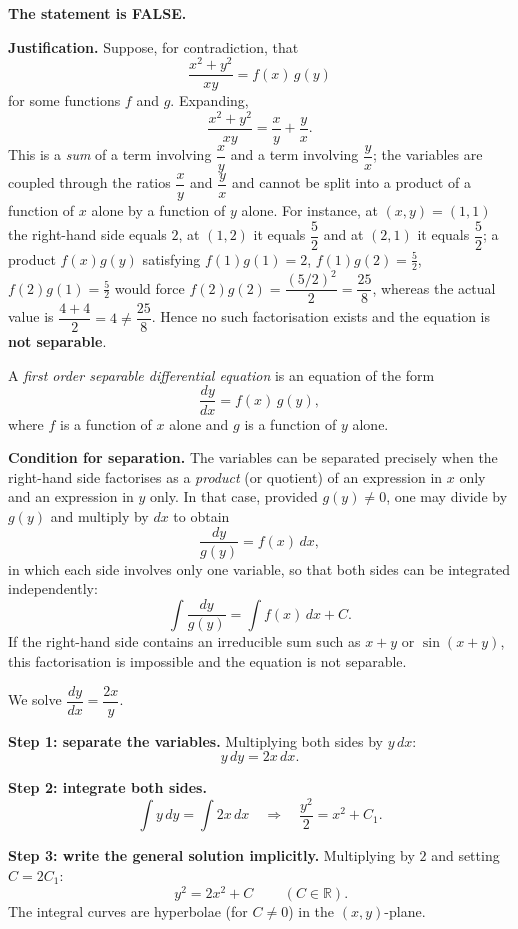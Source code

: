\documentclass[11pt]{article}
\begin{document}
\begin{corrige}
\textbf{The statement is FALSE.}

\textbf{Justification.} Suppose, for contradiction, that
\[
\frac{x^{2}+y^{2}}{xy}=f(x)\,g(y)
\]
for some functions $f$ and $g$. Expanding,
\[
\frac{x^{2}+y^{2}}{xy}=\frac{x}{y}+\frac{y}{x}.
\]
This is a \emph{sum} of a term involving $\dfrac{x}{y}$ and a term involving $\dfrac{y}{x}$; the variables are coupled through the ratios $\dfrac{x}{y}$ and $\dfrac{y}{x}$ and cannot be split into a product of a function of $x$ alone by a function of $y$ alone. For instance, at $(x,y)=(1,1)$ the right-hand side equals $2$, at $(1,2)$ it equals $\dfrac{5}{2}$ and at $(2,1)$ it equals $\dfrac{5}{2}$; a product $f(x)g(y)$ satisfying $f(1)g(1)=2$, $f(1)g(2)=\tfrac52$, $f(2)g(1)=\tfrac52$ would force $f(2)g(2)=\dfrac{(5/2)^2}{2}=\dfrac{25}{8}$, whereas the actual value is $\dfrac{4+4}{2}=4\neq\dfrac{25}{8}$. Hence no such factorisation exists and the equation is \textbf{not separable}.
\end{corrige}

\begin{corrige}
\begin{definition}
A \emph{first order separable differential equation} is an equation of the form
\[
\frac{dy}{dx}=f(x)\,g(y),
\]
where $f$ is a function of $x$ alone and $g$ is a function of $y$ alone.
\end{definition}

\textbf{Condition for separation.} The variables can be separated precisely when the right-hand side factorises as a \emph{product} (or quotient) of an expression in $x$ only and an expression in $y$ only. In that case, provided $g(y)\neq 0$, one may divide by $g(y)$ and multiply by $dx$ to obtain
\[
\frac{dy}{g(y)}=f(x)\,dx,
\]
in which each side involves only one variable, so that both sides can be integrated independently:
\[
\int \frac{dy}{g(y)}=\int f(x)\,dx + C.
\]
If the right-hand side contains an irreducible sum such as $x+y$ or $\sin(x+y)$, this factorisation is impossible and the equation is not separable.
\end{corrige}

\begin{corrige}
We solve $\dfrac{dy}{dx}=\dfrac{2x}{y}$.

\textbf{Step 1: separate the variables.} Multiplying both sides by $y\,dx$:
\[
y\,dy = 2x\,dx.
\]

\textbf{Step 2: integrate both sides.}
\[
\int y\,dy=\int 2x\,dx
\quad\Longrightarrow\quad
\frac{y^{2}}{2}=x^{2}+C_{1}.
\]

\textbf{Step 3: write the general solution implicitly.} Multiplying by $2$ and setting $C=2C_{1}$:
\[
\boxed{\,y^{2}=2x^{2}+C\,}\qquad (C\in\mathbb{R}).
\]
The integral curves are hyperbolae (for $C\neq 0$) in the $(x,y)$-plane.
\end{corrige}
\end{document}
